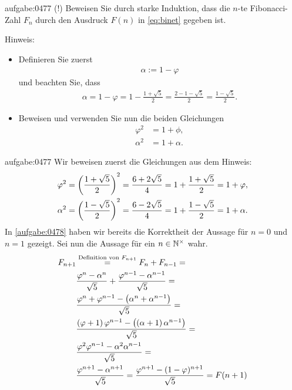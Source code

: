 \clearpage
\begin{aufgabe}{aufgabe:0477}
(!) Beweisen Sie durch starke Induktion, dass die $n$-te Fibonacci-Zahl $F_n$ durch den Ausdruck $F(n)$ in \cref{eq:binet} gegeben ist. 

\noindent
Hinweis:
\begin{itemize}
    \item Definieren Sie zuerst
    \begin{align*}
        \alpha := 1-\varphi
    \end{align*}
    und beachten Sie, dass
    \begin{align*}
        \alpha = 1-\varphi = 1 - \frac{1+\sqrt{5}}{2} = \frac{2 - 1 - \sqrt{5}}{2} =  \frac{1-\sqrt{5}}{2}.
    \end{align*}
    \item Beweisen und verwenden Sie nun die beiden Gleichungen
    \begin{align*}
        \varphi^2 &= 1+\phi,\\
        \alpha^2 &= 1+\alpha.
    \end{align*}
\end{itemize}
\end{aufgabe}
\begin{antwort}{aufgabe:0477}
Wir beweisen zuerst die Gleichungen aus dem Hinweis:
\begin{align*}
    \varphi^2 &= \left(\frac{1+\sqrt{5}}{2}\right)^2 = \frac{6+2\sqrt{5}}{4} = 1 + \frac{1+\sqrt{5}}{2} = 1 + \varphi, \\
    \alpha^2 &= \left(\frac{1-\sqrt{5}}{2}\right)^2 = \frac{6-2\sqrt{5}}{4} = 1 + \frac{1-\sqrt{5}}{2} = 1 + \alpha.
\end{align*}
In \cref{aufgabe:0478} haben wir bereits die Korrektheit der Aussage für $n=0$ und $n=1$ gezeigt. Sei nun die Aussage für ein $n\in\mathbb{N}^{\times}$ wahr.
\begin{align*}
    F_{n+1} & \stackrel{\text{Definition von $F_{n+1}$}}{=} F_n + F_{n-1} = \\
    &\frac{\varphi^{n}-\alpha^{n}}{\sqrt{5}} + \frac{\varphi^{n-1}-\alpha^{n-1}}{\sqrt{5}} = \\
    &\frac{\varphi^{n} + \varphi^{n-1} - \left(\alpha^{n}+\alpha^{n-1}\right)}{\sqrt{5}} = \\
    &\frac{\left(\varphi + 1\right)\varphi^{n-1} - \left(\left(\alpha + 1\right)\alpha^{n-1}\right)}{\sqrt{5}} = \\
    &\frac{\varphi^2\varphi^{n-1} - \alpha^2\alpha^{n-1}}{\sqrt{5}} = \\
    &\frac{\varphi^{n+1}-\alpha^{n+1}}{\sqrt{5}} = \frac{\varphi^{n+1}-(1-\varphi)^{n+1}}{\sqrt{5}} = F(n+1)
\end{align*}
\end{antwort}

